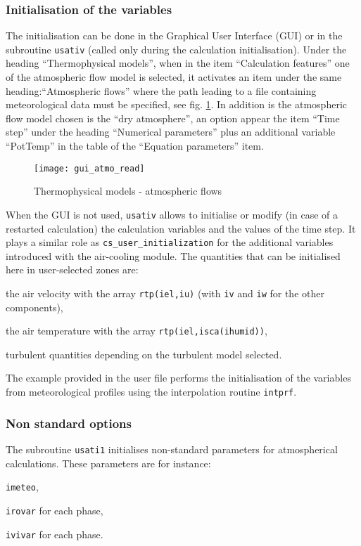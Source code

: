{{{\subsubsection{Initialisation of the variables}

The initialisation can be done in the Graphical User Interface (GUI)
 or in the subroutine \texttt{usativ} (called only during the calculation
 initialisation). Under the heading ``Thermophysical models'', when in the
 item ``Calculation features'' one of the atmospheric flow model is selected,
 it activates an item under the same heading:``Atmospheric flows'' where the
 path leading to a file containing meteorological data must be specified, see
 fig. \ref {fig:Ini-atmo}. In addition is the atmospheric flow model chosen is
 the ``dry atmosphere'', an option appear the item ``Time step'' under the
 heading ``Numerical parameters'' plus an additional variable ``PotTemp'' 
in the table of the ``Equation parameters'' item.

\begin{figure}[ht]
\begin{center}
\texttt{[image: gui\_atmo\_read]}
\caption{Thermophysical models - atmospheric flows}
\label{fig:Ini-atmo}
\end{center}
\end{figure}

When the GUI is not used, \texttt{usativ} allows to initialise or modify
 (in case of a restarted calculation) the calculation variables and the 
values of the time step. It plays a similar role as \texttt{cs\_user\_initialization} for 
the additional variables introduced with the air-cooling module. The 
quantities that can be initialised here in user-selected zones are:
\begin{list}{-}{}
 \item the air velocity with the array \texttt{rtp(iel,iu)} (with
 \texttt{iv} and \texttt{iw} for the other components),
 \item the air temperature with the array \texttt{rtp(iel,isca(ihumid))},
 \item turbulent quantities depending on the turbulent model selected.
\end{list}
The example provided in the user file performs the initialisation of the 
variables from meteorological profiles using the interpolation routine \texttt{intprf}.

\subsubsection{Non standard options}
The subroutine \texttt{usati1} initialises non-standard parameters for 
atmospherical calculations. These parameters are for instance:
\begin{list}{-}{}
 \item \texttt{imeteo},
 \item \texttt{irovar} for each phase,
 \item \texttt{ivivar} for each phase.
\end{list}

}}}

